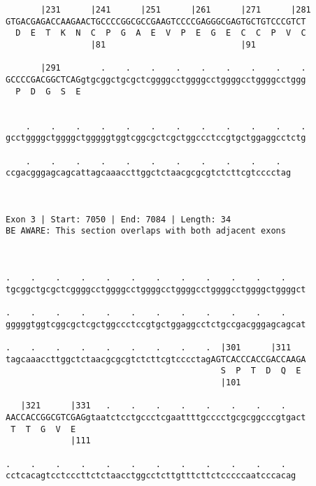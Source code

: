 \documentclass{article}
\begin{document}
\begin{Verbatim}
       |231      |241      |251      |261      |271      |281
GTGACGAGACCAAGAACTGCCCCGGCGCCGAAGTCCCCGAGGGCGAGTGCTGTCCCGTCT
  D  E  T  K  N  C  P  G  A  E  V  P  E  G  E  C  C  P  V  C
                 |81                           |91          
  
       |291        .    .    .    .    .    .    .    .    .
GCCCCGACGGCTCAGgtgcggctgcgctcggggcctggggcctggggcctggggcctggg
  P  D  G  S  E                                             
                                                            
  
    .    .    .    .    .    .    .    .    .    .    .    .
gcctggggctggggctgggggtggtcggcgctcgctggccctccgtgctggaggcctctg
                                                            
    .    .    .    .    .    .    .    .    .    .    .  
ccgacgggagcagcattagcaaaccttggctctaacgcgcgtctcttcgtcccctag
                                                         
                                                         
 
Exon 3 | Start: 7050 | End: 7084 | Length: 34
BE AWARE: This section overlaps with both adjacent exons



.    .    .    .    .    .    .    .    .    .    .    .    
tgcggctgcgctcggggcctggggcctggggcctggggcctggggcctggggctggggct
                                                            
.    .    .    .    .    .    .    .    .    .    .    .    
gggggtggtcggcgctcgctggccctccgtgctggaggcctctgccgacgggagcagcat
                                                            
.    .    .    .    .    .    .    .    .  |301      |311   
tagcaaaccttggctctaacgcgcgtctcttcgtcccctagAGTCACCCACCGACCAAGA
                                           S  P  T  D  Q  E 
                                           |101             
  
   |321      |331   .    .    .    .    .    .    .    .    
AACCACCGGCGTCGAGgtaatctcctgccctcgaattttgcccctgcgcggcccgtgact
 T  T  G  V  E                                              
             |111                                           
  
.    .    .    .    .    .    .    .    .    .    .    .  
cctcacagtcctcccttctctaacctggcctcttgtttcttctcccccaatcccacag
                                                          
                                                          
 

\end{Verbatim}
\end{document}
